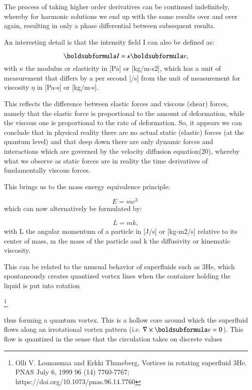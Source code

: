 \documentclass[twoside,final]{article}
\begin{document}
{The process of taking higher order derivatives can be continued indefinitely,
whereby for harmonic solutions we end up with the same results over and over
again, resulting in only a phase differential between subsequent results.  

An interesting detail is that the intensity field I can also be defined as:

\begin{equation}\label{seq:refText26}
\boldsubformula I=\kappa \boldsubformula v,
\end{equation}
with $\kappa $ the modulus or elasticity in [Pa] or [kg/m-s2], which has a unit
of measurement that differs by a per second [/s] from the unit of measurement
for viscosity $\eta $ in [Pa-s] or [kg/m-s].

This reflects the difference between elastic forces and viscous (shear) forces,
namely that the  elastic force is proportional to the amount of deformation,
while the viscous one is proportional to the rate of deformation. So, it appears
we can conclude that in physical reality there are no actual static (elastic)
forces (at the quantum level) and that deep down there are only dynamic forces
and interactions which are governed by the velocity diffusion equation(20),
whereby what we observe as static forces are in reality the time derivatives of
fundamentally viscous forces.

This brings us to the mass energy equivalence principle:

\begin{equation}
E=\mathit{mc}^{2,}
\end{equation}
which can now alternatively be formulated by:

\begin{equation}\label{seq:refText28}
L=mk,
\end{equation}
with L the angular momentum of a particle in [J/s] or [kg-m2/s] relative to its center of mass, m the mass of the
particle and k the diffusivity or kinematic viscosity. 

This can be related to the unusual behavior of superfluids such as 3He, which
spontaneously creates quantized vortex lines when the container holding the
liquid is put into rotation

\footnote{  Olli V. Lounasmaa and Erkki Thuneberg,
Vortices in rotating superfluid 3He. PNAS July 6, 1999 96 (14) 7760-7767;
https://doi.org/10.1073/pnas.96.14.7760 \par }, 

thus forming a quantum vortex.
This is a hollow core around which the superfluid flows along an irrotational
vortex pattern (i.e. $\nabla \times \boldsubformula v=0$). This flow is
quantized in the sense that the circulation takes on discrete values

}
\end{document}
